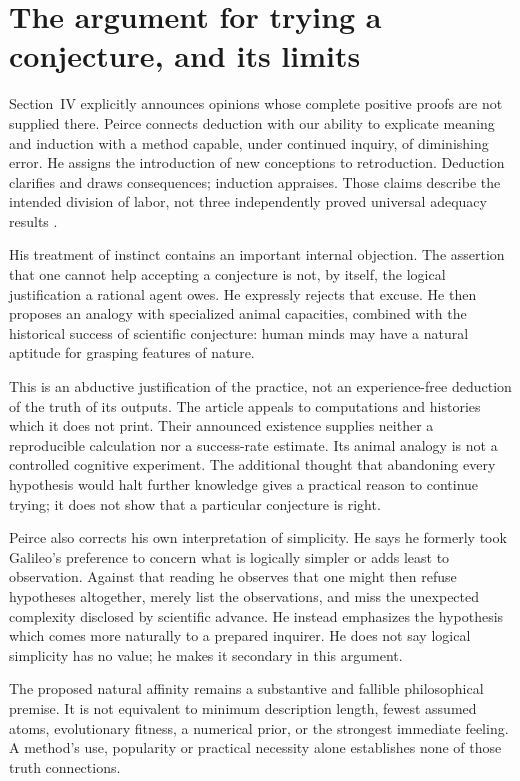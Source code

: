 \section{The argument for trying a conjecture, and its limits}
\label{sec:p16-peirce-validity}

Section~IV explicitly announces opinions whose complete positive
proofs are not supplied there. Peirce connects deduction with our ability
to explicate meaning and induction with a method capable, under continued
inquiry, of diminishing error. He assigns the introduction of new
conceptions to retroduction. Deduction clarifies and draws consequences;
induction appraises. Those claims describe the intended division of
labor, not three independently proved universal adequacy results
\parencite[secs.~III--IV]{Peirce1908NeglectedPrimary}.

His treatment of instinct contains an important internal objection.
The assertion that one cannot help accepting a conjecture is not, by
itself, the logical justification a rational agent owes. He expressly
rejects that excuse. He then proposes an analogy with specialized animal
capacities, combined with the historical success of scientific conjecture:
human minds may have a natural aptitude for grasping features of nature.

This is an abductive justification of the practice, not an experience-free
deduction of the truth of its outputs. The article appeals to computations
and histories which it does not print. Their announced existence supplies
neither a reproducible calculation nor a success-rate estimate. Its
animal analogy is not a controlled cognitive experiment. The additional
thought that abandoning every hypothesis would halt further knowledge
gives a practical reason to continue trying; it does not show that a
particular conjecture is right.

Peirce also corrects his own interpretation of simplicity. He says
he formerly took Galileo's preference to concern what is logically
simpler or adds least to observation. Against that reading he observes
that one might then refuse hypotheses altogether, merely list the
observations, and miss the unexpected complexity disclosed by scientific
advance. He instead emphasizes the hypothesis which comes more naturally
to a prepared inquirer. He does not say logical simplicity has no value;
he makes it secondary in this argument.

The proposed natural affinity remains a substantive and fallible
philosophical premise. It is not equivalent to minimum description
length, fewest assumed atoms, evolutionary fitness, a numerical prior,
or the strongest immediate feeling. A method's use, popularity or
practical necessity alone establishes none of those truth connections.

